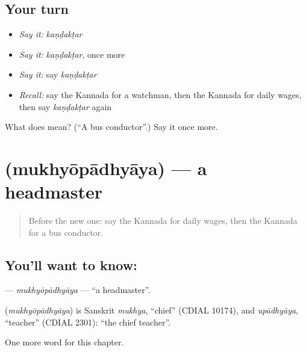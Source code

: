 \subsection*{Your turn}
\begin{itemize}
\raggedright
  \item \emph{Say it:} \emph{kaṇḍakṭar}
  \item \emph{Say it:} \emph{kaṇḍakṭar}, once more
  \item \emph{Say it:} say \emph{kaṇḍakṭar}
  \item \emph{Recall:} say the Kannada for a watchman, then the Kannada for daily wages, then say \emph{kaṇḍakṭar} again
\end{itemize}

\begin{tcolorbox}[breakable,colback=teal!4,colframe=teal!35!black,title={Before you move on}]
What does  mean? (\textquotedblleft{}A bus conductor\textquotedblright{}.) Say it once more.
\end{tcolorbox}
\section[\texorpdfstring{\kn{ಮುಖ್ಯೋಪಾಧ್ಯಾಯ} (mukhyōpādhyāya)}{ಮುಖ್ಯೋಪಾಧ್ಯಾಯ (mukhyōpādhyāya)}]{ (mukhyōpādhyāya) — a headmaster}

\label{lesson:KA-C197-mukhyopadhyaya}



\begin{quote}
Before the new one: say the Kannada for daily wages, then the Kannada for a bus conductor.
\end{quote}

\subsection*{You'll want to know: }
\textbf{} — \emph{mukhyōpādhyāya} — \textquotedblleft{}a headmaster\textquotedblright{}.

\begin{cousinweb}
\textbf{} (\emph{mukhyōpādhyāya}) is Sanskrit \emph{mukhya}, \textquotedblleft{}chief\textquotedblright{} (CDIAL 10174), and \emph{upādhyāya}, \textquotedblleft{}teacher\textquotedblright{} (CDIAL 2301): \textquotedblleft{}the chief teacher\textquotedblright{}.
\end{cousinweb}

\begin{grammarlens}[title={What you've built}]
One more word for this chapter.
\end{grammarlens}

